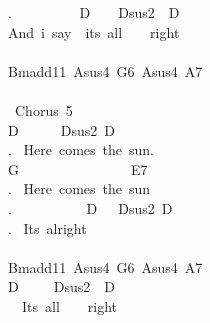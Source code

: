 {. \ \ \ \ \ \ \ \ \ D\ \ \ \ Dsus2\ \ D\\
And\ i\ say\ \ its\ all\ \ \ \ right\\
\\
Bmadd11\ Asus4\ G6\ Asus4\ A7\\
\\
\lbrack\ Chorus\ 5\rbrack\\
D\ \ \ \ \ \ Dsus2\ D\\
. \ Here\ comes\ the\ sun.\\
G\ \ \ \ \ \ \ \ \ \ \ \ \ \ \ \ E7\\
. \ Here\ comes\ the\ sun\\
. \ \ \ \ \ \ \ \ \ \ D\ \ \ Dsus2\ D\\
. \ Its\ alright\\
\\
Bmadd11\ Asus4\ G6\ Asus4\ A7\ \\
D\ \ \ \ \ Dsus2\ \ D\\
\ \ Its\ all\ \ \ \ right\ }
